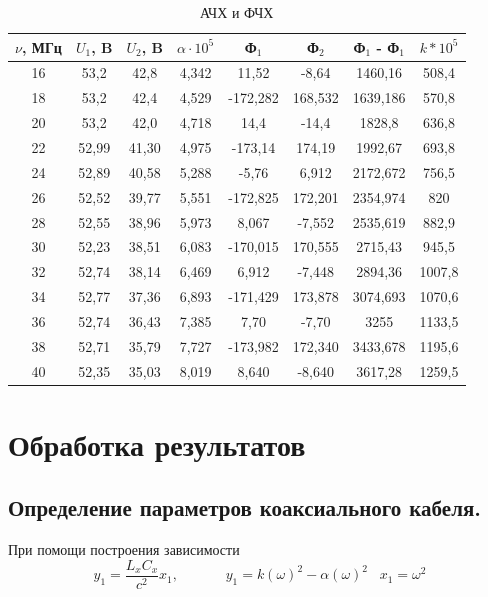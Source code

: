 \documentclass[a4paper,12pt]{article} %
\begin{document}
    \begin{table}[h]
	\centering
        \caption{АЧХ и ФЧХ}  \label{decr}
	\begin{tabular}{|c|c|c|c|c|c|c|c|}
	    \hline
		$\nu$, МГц& $U_1$, B& $U_2$, B & $\alpha \cdot 10^5 $ &  Ф$_1$& Ф$_2$& Ф$_1$ - Ф$_1$ & $k*10^5$  \\ \hline
            16& 53,2 & 42,8 & 4,342&11,52 & -8,64 & 1460,16& 508,4 \\ \hline
            18& 53,2 & 42,4 & 4,529&-172,282 & 168,532& 1639,186 & 570,8  \\ \hline
            20& 53,2 & 42,0 & 4,718&14,4 & -14,4 & 1828,8 & 636,8   \\ \hline
            22& 52,99 & 41,30 & 4,975& -173,14 & 174,19& 1992,67 &693,8 \\ \hline
            24& 52,89 & 40,58 & 5,288&-5,76 & 6,912 & 2172,672 &756,5 \\ \hline
            26& 52,52 & 39,77 & 5,551&-172,825 & 172,201 & 2354,974  & 820 \\ \hline
            28& 52,55 & 38,96 & 5,973&8,067 & -7,552 & 2535,619 &882,9\\ \hline
            30& 52,23 & 38,51 & 6,083&-170,015 & 170,555 & 2715,43 &945,5  \\ \hline
            32& 52,74 & 38,14 & 6,469&6,912 & -7,448 & 2894,36 &1007,8 \\ \hline
            34& 52,77 & 37,36 & 6,893&-171,429 & 173,878 & 3074,693 & 1070,6\\ \hline
            36& 52,74 & 36,43& 7,385&7,70 & -7,70 & 3255 &1133,5 \\ \hline
            38& 52,71 & 35,79 & 7,727&-173,982 & 172,340 & 3433,678 & 1195,6\\ \hline
            40& 52,35 & 35,03 & 8,019&8,640& -8,640 & 3617,28 &1259,5 \\ \hline
            
	\end{tabular}
\end{table}


\section*{Обработка результатов}
\subsection*{Определение параметров коаксиального кабеля.}
При помощи построения зависимости
\[y_1 = \frac{L_x C_x}{c^2}x_1, \;\;\; \;\;\;\; \;\;\;\;\; y_1 = k(\omega)^2 - \alpha(\omega)^2 \;\;\; x_1 = \omega^2\]
\end{document}

